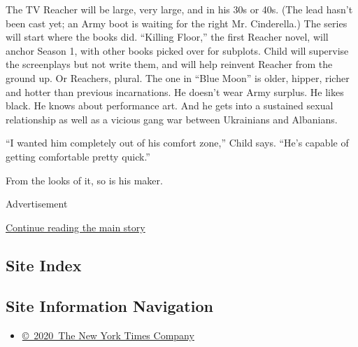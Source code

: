 The TV Reacher will be large, very large, and in his 30s or 40s. (The
lead hasn't been cast yet; an Army boot is waiting for the right Mr.
Cinderella.) The series will start where the books did. ``Killing
Floor,'' the first Reacher novel, will anchor Season 1, with other books
picked over for subplots. Child will supervise the screenplays but not
write them, and will help reinvent Reacher from the ground up. Or
Reachers, plural. The one in ``Blue Moon'' is older, hipper, richer and
hotter than previous incarnations. He doesn't wear Army surplus. He
likes black. He knows about performance art. And he gets into a
sustained sexual relationship as well as a vicious gang war between
Ukrainians and Albanians.

``I wanted him completely out of his comfort zone,'' Child says. ``He's
capable of getting comfortable pretty quick.''

From the looks of it, so is his maker.

Advertisement

\protect\hyperlink{after-bottom}{Continue reading the main story}

\hypertarget{site-index}{%
\subsection{Site Index}\label{site-index}}

\hypertarget{site-information-navigation}{%
\subsection{Site Information
Navigation}\label{site-information-navigation}}

\begin{itemize}
\tightlist
\item
  \href{https://help.nytimes3xbfgragh.onion/hc/en-us/articles/115014792127-Copyright-notice}{©~2020~The
  New York Times Company}
\end{itemize}

